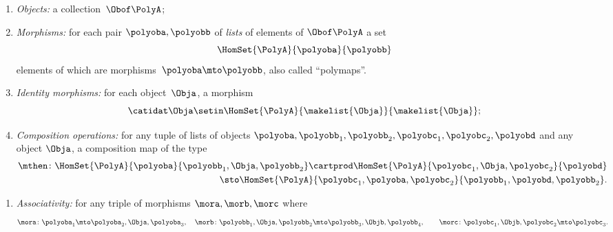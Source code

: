 \begin{ctdefinition}[Polycategory]
    \constit
    \begin{enumerate}
        \item \emph{Objects:} a collection~$\Obof\PolyA$;
        \item \emph{Morphisms:} for each pair $\polyoba, \polyobb$ of \emph{lists} of elements of $\Obof\PolyA$
              a set
              \begin{equation}
                  \HomSet{\PolyA}{\polyoba}{\polyobb}
              \end{equation}
              elements of which are morphisms~$\polyoba \mto \polyobb$,
              also called ``polymaps''.
        \item \emph{Identity morphisms:} for each object~$\Obja$, a morphism
              \begin{equation}
                  \catidat\Obja \setin \HomSet{\PolyA}{\makelist{\Obja}}{\makelist{\Obja}};
              \end{equation}
        \item \emph{Composition operations:} for any tuple of lists of objects
              $\polyoba, \polyobb_1, \polyobb_2, \polyobc_1, \polyobc_2, \polyobd$ and any object $\Obja$,
              a composition map of the type
              \begin{equation}
                  \begin{aligned}
                      \mthen \colon \HomSet{\PolyA}{\polyoba}{\polyobb_1,\Obja,\polyobb_2}
                      \cartprod
                      \HomSet{\PolyA}{\polyobc_1,\Obja,\polyobc_2}{\polyobd} \\
                      \sto
                      \HomSet{\PolyA}{\polyobc_1,\polyoba,\polyobc_2}{\polyobb_1,\polyobd,\polyobb_2}.
                  \end{aligned}
              \end{equation}
    \end{enumerate}
    \condit
    \begin{enumerate}
        \item \emph{Associativity:} for any triple of morphisms $\mora,\morb,\morc$ where
              \begin{equation}
                  \mora \colon \polyoba_1 \mto \polyoba_2,\Obja,\polyoba_3,
                  \quad
                  \morb  \colon \polyobb_1 , \Obja,  \polyobb_2 \mto \polyobb_3, \Objb ,\polyobb_4,
                  \qquad
                  \morc \colon \polyobc_1 , \Objb ,  \polyobc_2 \mto \polyobc_3.
              \end{equation}

\end{enumerate}
\end{ctdefinition}
